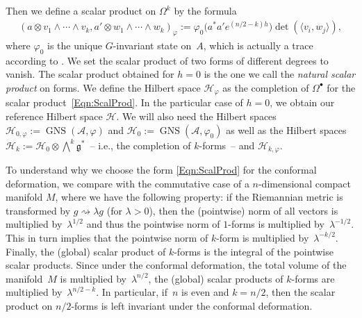 \documentclass[11pt]{article}
\newcommand{\Aa}{\mathcal{A}}
\newcommand{\Hh}{\mathscr{H}}
\newcommand{\LieG}{\mathfrak{g}}
\DeclareMathOperator{\GNS}{GNS}
\numberwithin{equation}{section}
\begin{document}
Then we def\/ine a scalar product on $\Omega^k$ by the formula
\begin{gather}
\label{Eqn:ScalProd}
(a \otimes v_1 \wedge \cdots \wedge v_k, a' \otimes w_1 \wedge \cdots \wedge w_k )_\varphi := \varphi_0\big( a^* a' e^{(n/2-k)h}\big) \det( \langle v_i, w_j \rangle ),
\end{gather}
where $\varphi_0$ is the unique $G$-invariant state on~$A$, which is actually a trace according to \cite[Theorem~3.1, p.~8]{ErgodActAHK}. We set the scalar product of two forms of dif\/ferent degrees to vanish. The scalar product obtained for $h = 0$ is the one we call the \emph{natural scalar product} on forms. We def\/ine the Hilbert space $\Hh_\varphi$ as the completion of $\Omega^\bullet$ for the scalar product~\eqref{Eqn:ScalProd}. In the particular case of $h = 0$, we obtain our reference Hilbert space $\Hh$. We will also need the Hilbert spaces $\Hh_{0, \varphi} := \GNS(\Aa, \varphi)$ and $\Hh_{0} := \GNS(\Aa, \varphi_0)$ as well as the Hilbert spaces $\Hh_k := \Hh_0 \otimes \bigwedge^k \LieG^*$~-- i.e., the completion of $k$-forms~-- and $\Hh_{k, \varphi}$.

To understand why we choose the form \eqref{Eqn:ScalProd} for the conformal deformation, we compare with the commutative case of a $n$-dimensional compact manifold $M$, where we have the following property: if the Riemannian metric is transformed by $g \rightsquigarrow \lambda g$ (for $\lambda > 0$), then the (pointwise) norm of all vectors is multiplied by~$\lambda^{1/2}$ and thus the pointwise norm of $1$-forms is multiplied by~$\lambda^{-1/2}$. This in turn implies that the pointwise norm of $k$-form is multiplied by~$\lambda^{-k/2}$. Finally, the (global) scalar product of $k$-forms is the integral of the pointwise scalar products. Since under the conformal deformation, the total volume of the manifold~$M$ is multiplied by~$\lambda^{n/2}$, the (global) scalar products of $k$-forms are multiplied by~$\lambda^{n/2-k}$. In particular, if~$n$ is even and $k = n/2$, then the scalar product on $n/2$-forms is left invariant under the conformal deformation.
\end{document}
